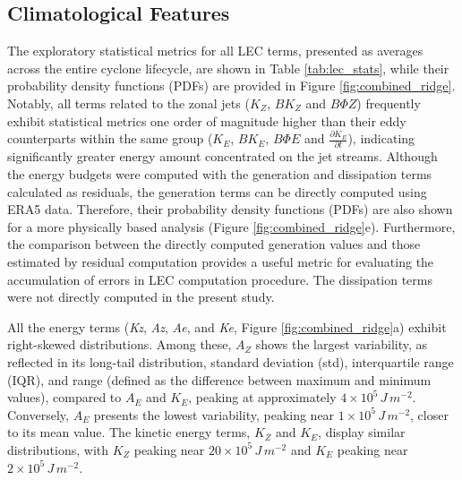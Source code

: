 \documentclass[pdflatex,sn-chicago]{sn-jnl}%
\theoremstyle{plain}
\theoremstyle{definition}
\theoremstyle{remark}
\theoremstyle{definition}
\begin{document}
\subsection{Climatological Features}\label{sec:climatology}

The exploratory statistical metrics for all LEC terms, presented as averages across the entire cyclone lifecycle, are shown in Table \ref{tab:lec_stats}, while their probability density functions (PDFs) are provided in Figure \ref{fig:combined_ridge}. Notably, all terms related to the zonal jets ($K_Z$, $BK_Z$ and $B\Phi Z$) frequently exhibit statistical metrics one order of magnitude higher than their eddy counterparts within the same group ($K_E$, $BK_E$, $B\Phi E$ and \(\frac{\partial K_E}{\partial t}\)), indicating significantly greater energy amount concentrated on the jet streams. Although the energy budgets were computed with the generation and dissipation terms calculated as residuals, the generation terms can be directly computed using ERA5 data. Therefore, their probability density functions (PDFs) are also shown for a more physically based analysis (Figure \ref{fig:combined_ridge}e). Furthermore, the comparison between the directly computed generation values and those estimated by residual computation provides a useful metric for evaluating the accumulation of errors in LEC computation procedure. The dissipation terms were not directly computed in the present study.


All the energy terms (\textit{Kz}, \textit{Az}, \textit{Ae}, and \textit{Ke}, Figure \ref{fig:combined_ridge}a) exhibit right-skewed distributions. Among these, $A_Z$ shows the largest variability, as reflected in its long-tail distribution, standard deviation (std), interquartile range (IQR), and range (defined as the difference between maximum and minimum values), compared to $A_E$ and $K_E$, peaking at approximately $4 \times 10^5 \, J \, m^{-2}$. Conversely, $A_E$ presents the lowest variability, peaking near $1 \times 10^5 \, J \, m^{-2}$, closer to its mean value. The kinetic energy terms, $K_Z$ and $K_E$, display similar distributions, with $K_Z$ peaking near $20 \times 10^5 \, J \, m^{-2}$ and $K_E$ peaking near $2 \times 10^5 \, J \, m^{-2}$.
\end{document}
